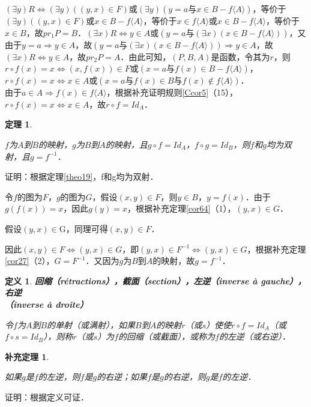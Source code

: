 \documentclass[12pt, a4paper, oneside]{book}
\newtheorem{theo}{定理}
\newtheorem{cor}{补充定理}
\newtheorem{de}{定义}
\begin{document}
			$(\exists y)R\Leftrightarrow (\exists y)( (y, x)\in F)\text{或}(\exists y)(y=a\text{与}x\in B-f\langle A \rangle )$，等价于$(\exists y)((y, x)\in F)\text{或}x\in B-f\langle A \rangle $，等价于$x\in f\langle A \rangle \text{或}x\in B-f\langle A \rangle $，等价于$x\in B$，故$pr_1P=B$．$(\exists x)R\Leftrightarrow y\in A\text{或} (y=a\text{与}(\exists x)( x\in B-f\langle A \rangle ))$，又由于$y=a\Rightarrow y\in A$，故$(y=a\text{与}(\exists x)( x\in B-f\langle A \rangle ))\Rightarrow y\in A$，故$(\exists x)R\Leftrightarrow y\in A$，故$pr_2P=A$．由此可知，$(P, B, A)$是函数，令其为$r$，则$r\circ f(x)=x\Leftrightarrow (x, f(x))\in F\text{或}(x=a\text{与}f(x)\in B-f\langle A \rangle )$，$r\circ f(x)=x\Leftrightarrow x\in A\text{或}(x=a\text{与}f(x)\in B\text{与}f(x)\notin f\langle A \rangle )$．$由于a\in A\Rightarrow f(x)\in f\langle A \rangle $，根据补充证明规则\ref{Ccor5}（15），$r\circ f(x)=x\Leftrightarrow x\in A$，故$r\circ f=Id_A$．

			\begin{theo}\label{theo20}
				\hfill\par
				$f$为$A$到$B$的映射，$g$为$B$到$A$的映射，且$g\circ f=Id_A$，$f\circ g=Id_B$，则$f$和$g$均为双射，且$g=f^{-1}$．
			\end{theo}
			证明：根据定理\ref{theo19}，f和g均为双射．
			\par
			令$f$的图为$F$，$g$的图为$G$，假设$(x, y)\in F$，则$y\in B$，$y=f(x)$．由于$g(f(x))=x$，因此$g(y)=x$，根据补充定理\ref{cor64}（1），$(y, x)\in G$．
			\par
			假设$(y, x)\in $G，同理可得$(x, y)\in F$．
			\par
			因此$(x, y)\in F\Leftrightarrow (y, x)\in G$，即$(y, x)\in F^{-1}\Leftrightarrow (y, x)\in G$，根据补充定理\ref{cor27}（2），$G=F^{-1}$．又因为$g$为$B$到$A$的映射，故$g=f^{-1}$．

			\begin{de}
				\textbf{回缩（rétractions），截面（section），左逆（inverse à gauche），右逆\\（inverse à droite）}
				\par
				令$f$为$A$到$B$的单射（或满射），如果$B$到$A$的映射$r$（或$s$）使使$r\circ f=Id_A$（或$f\circ s=Id_B$），则称$r$（或$s$）为$f$的回缩（或截面），或称为$f$的左逆（或右逆）．
			\end{de}

			\begin{cor}\label{cor79}
				\hfill\par
				如果$g$是$f$的左逆，则$f$是$g$的右逆；如果$f$是$g$的右逆，则$g$是$f$的左逆．
			\end{cor}
			证明：根据定义可证．
						
\end{document}
